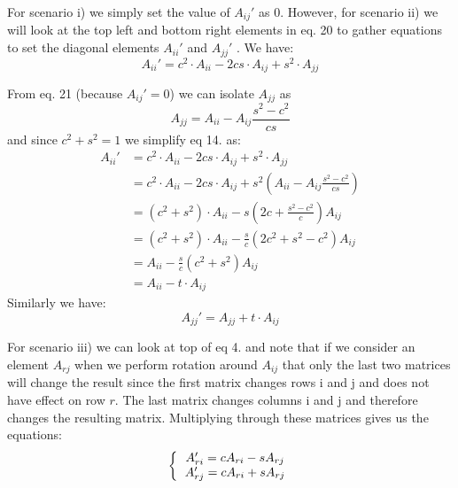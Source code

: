 \documentclass[12pt,twoside]{article}
\begin{document}
For scenario i) we simply set the value of $A_{ij}'$ as 0. However, for scenario ii) we will look at the top left and bottom right elements in eq. 20 to gather equations to set the diagonal elements $A_{ii}'$ and $A_{jj}'$ . We have:
\begin{equation}
A_{ii}' = c^2 \cdot A_{ii} - 2cs\cdot A_{ij} + s^2\cdot A_{jj}
\end{equation}

From eq. 21 (because $A_{ij}'=0$) we can isolate $A_{jj}$ as\\
\begin{equation}
A_{jj} = A_{ii} - A_{ij}\frac{s^2-c^2}{cs}
\end{equation}
and since $c^2+s^2=1$ we simplify eq 14. as:
\begin{equation}
\begin{split}
A_{ii}' &= c^2 \cdot A_{ii} - 2cs\cdot A_{ij} + s^2\cdot A_{jj}\\
& = c^2 \cdot A_{ii} - 2cs\cdot A_{ij} + s^2 \left(A_{ii} - A_{ij}\frac{s^2-c^2}{cs}     \right)\\
& = (c^2 + s^2) \cdot A_{ii} - s\left(2c +  \frac{s^2-c^2}{c}      \right)A_{ij}\\
&= (c^2 + s^2) \cdot A_{ii} - \frac{s}{c}\left(2c^2 +  s^2-c^2      \right)A_{ij}\\
& = A_{ii} - \frac{s}{c}\left(c^2 +  s^2      \right)A_{ij}\\
& = A_{ii} - t\cdot A_{ij} 
\end{split}
\end{equation}
Similarly we have:\\
\begin{equation}
A_{jj}' = A_{jj} + t\cdot A_{ij}
\end{equation}



For scenario iii) we can look at top of eq 4. and note that if we consider an element $A_{rj}$ when we perform rotation around $A_{ij}$ that only the last two matrices will change the result since the first matrix changes rows i and j and does not have effect on row $r$. The last matrix changes columns i and j and therefore changes the resulting matrix. Multiplying through these matrices gives us the equations:
\begin{equation}
\bigg\{
  \begin{tabular}{cc}
$A_{ri}' = cA_{ri} - sA_{rj}$\\
$A_{rj}' = cA_{ri} + sA_{rj}$\\
  \end{tabular}
\end{equation}\\
\end{document}
